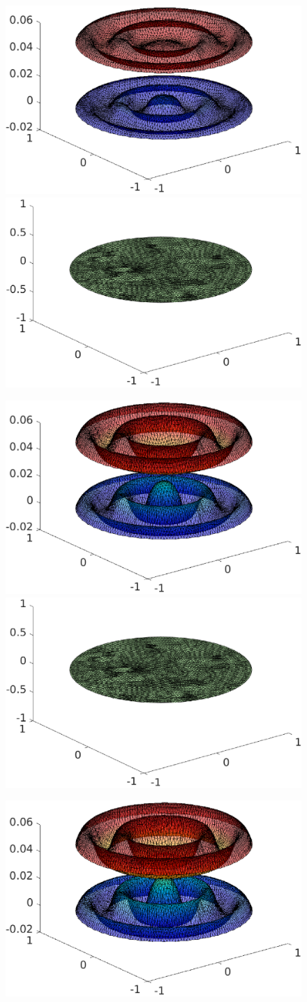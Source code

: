 \begin{frame}
\begin{overprint}
\begin{figure}
\end{figure}
\begin{figure}
\includegraphics[width=0.48 \textwidth]{fig_article_chap_2/test_case_128/fig_u1u2_hmax0,09_Dt0,001_tt02.eps} 
\quad
\includegraphics[width=0.48 \textwidth]{fig_article_chap_2/test_case_128/fig_lambda_hmax0,09_Dt0,001_tt02.eps} 
\end{figure}
\begin{figure}
\includegraphics[width=0.48 \textwidth]{fig_article_chap_2/test_case_128/fig_u1u2_hmax0,09_Dt0,001_tt03.eps} 
\quad
\includegraphics[width=0.48 \textwidth]{fig_article_chap_2/test_case_128/fig_lambda_hmax0,09_Dt0,001_tt02.eps} 
\end{figure}
\begin{figure}
\includegraphics[width=0.48 \textwidth]{fig_article_chap_2/test_case_128/fig_u1u2_hmax0,09_Dt0,001_tt04.eps} 

\end{figure}
\end{overprint}
\end{frame}
